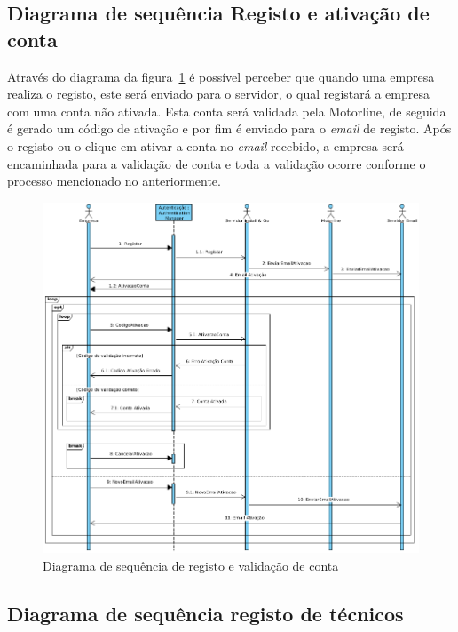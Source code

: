 \newpage

\subsection{Diagrama de sequência Registo e ativação de conta}

Através do diagrama da figura~\ref{fig:44} é possível perceber que quando uma empresa realiza o registo, este será enviado para o servidor, o qual registará a empresa com uma conta não ativada. Esta conta será validada pela Motorline, de seguida é gerado um código de ativação e por fim é enviado para o \textit{email} de registo. Após o registo ou o clique em ativar a conta no \textit{email} recebido, a empresa será encaminhada para a validação de conta e toda a validação ocorre conforme o processo mencionado no anteriormente.

\begin{figure}[htb]
    \centering
    \includegraphics[width=\textwidth]{images/diagramas/sequencia/diagrama_registo.png}
    \caption{Diagrama de sequência de registo e validação de conta}
    \label{fig:44}
\end{figure}

\newpage

\subsection{Diagrama de sequência registo de técnicos}

